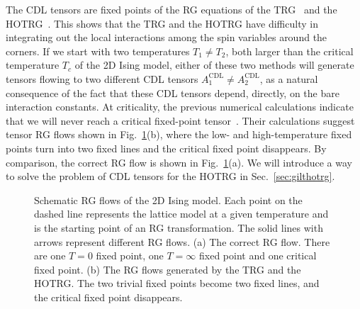 \documentclass[aps,prr,reprint,superscriptaddress,floatfix]{revtex4-2}
\begin{document}
The CDL tensors are fixed points of the RG equations of the TRG~\cite{LevinTalk,GuWen2009,tnr,gilts} and the HOTRG~\cite{hotrgfixpoint}.
This shows that the TRG and the HOTRG have difficulty in integrating out the local interactions among the spin variables around the corners. 
If we start with two temperatures $T_1 \neq T_2$, both larger than the critical temperature $T_c$ of the 2D Ising model, either of these two methods will generate tensors flowing to two different CDL tensors $A^{\text{CDL}}_1 \neq A^{\text{CDL}}_2$, as a natural consequence of the fact that these CDL tensors depend, directly, on the bare interaction constants. 
At criticality, the previous numerical calculations indicate that we will never reach a critical fixed-point tensor~\cite{Berker2008,tnr}.
Their calculations suggest tensor RG flows shown in Fig.~\ref{fig:tensorRGflow}(b), where the low- and high-temperature fixed points turn into two fixed lines and the critical fixed point disappears. 
By comparison, the correct RG flow is shown in Fig.~\ref{fig:tensorRGflow}(a).
We will introduce a way to solve the problem of CDL tensors for the HOTRG in Sec.~\ref{sec:gilthotrg}.
%
\begin{figure}[t]
    \caption{\label{fig:tensorRGflow}
        Schematic RG flows of the 2D Ising model.
        Each point on the dashed line represents the lattice model at a given temperature and is the starting point of an RG transformation.
        The solid lines with arrows represent different RG flows.
        (a) The correct RG flow. There are one $T=0$ fixed point, one $T=\infty$ fixed point and one critical fixed point.
        (b) The RG flows generated by the TRG and the HOTRG\@.
        The two trivial fixed points become two fixed lines, and the critical fixed point disappears.
    }
\end{figure}
%
\end{document}

